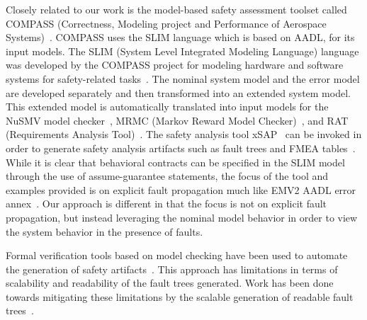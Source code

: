 Closely related to our work is the model-based safety assessment toolset called COMPASS (Correctness, Modeling project and Performance of Aerospace Systems)~\cite{10.1007/978-3-642-04468-7_15}. COMPASS uses the SLIM language which is based on AADL, for its input models. The SLIM (System Level Integrated Modeling Language) language was developed by the COMPASS project for modeling hardware and software systems for safety-related tasks~\cite{5185388, criticalembeddedsystems}. The nominal system model and the error model are developed separately and then transformed into an extended system model. This extended model is automatically translated into input models for the NuSMV model checker~\cite{Cimatti2000, NuSMV}, MRMC (Markov Reward Model Checker)~\cite{Katoen:2005:MRM:1114692.1115230, MRMC}, and RAT (Requirements Analysis Tool)~\cite{RAT}. The safety analysis tool xSAP~\cite{DBLP:conf/tacas/BittnerBCCGGMMZ16} can be invoked in order to generate safety analysis artifacts such as fault trees and FMEA tables~\cite{compass30toolset}. While it is clear that behavioral contracts can be specified in the SLIM model through the use of assume-guarantee statements, the focus of the tool and examples provided is on explicit fault propagation much like EMV2 AADL error annex~\cite{COMPASSusersguide}. Our approach is different in that the focus is not on explicit fault propagation, but instead leveraging the nominal model behavior in order to view the system behavior in the presence of faults. 


Formal verification tools based on model checking have been used to automate the generation of safety artifacts~\cite{symbAltaRica,10.1007/978-3-540-75596-8-13, DBLP:conf/tacas/BittnerBCCGGMMZ16}. This approach has limitations in terms of scalability and readability of the fault trees generated. Work has been done towards mitigating these limitations by the scalable generation of readable fault trees~\cite{10.1007/978-3-319-11936-6-7}.

